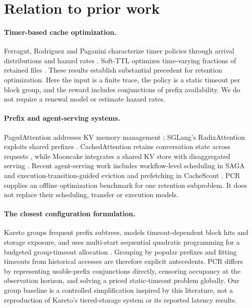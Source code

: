 \documentclass[11pt,a4paper]{article}
\begin{document}
\section{Relation to prior work}
\paragraph{Timer-based cache optimization.}
Ferragut, Rodriguez and Paganini characterize timer policies through arrival
distributions and hazard rates \cite{ferragut}. Soft-TTL optimizes time-varying
fractions of retained files \cite{softttl}. These results establish substantial
precedent for retention optimization. Here the input is a finite trace, the policy
is a static timeout per block group, and the reward includes conjunctions of
prefix availability. We do not require a renewal model or estimate hazard rates.

\paragraph{Prefix and agent-serving systems.}
PagedAttention addresses KV memory management \cite{paged}; SGLang's
RadixAttention exploits shared prefixes \cite{sglang}. CachedAttention retains
conversation state across requests \cite{cachedattention}, while Mooncake
integrates a shared KV store with disaggregated serving \cite{mooncake}. Recent
agent-serving work includes workflow-level scheduling in SAGA \cite{saga} and
execution-transition-guided eviction and prefetching in CacheScout
\cite{cachescout}. PCR supplies an offline optimization benchmark for one
retention subproblem. It does not replace their scheduling, transfer or execution
models.

\paragraph{The closest configuration formulation.}
Kareto groups frequent prefix subtrees, models timeout-dependent block hits and
storage exposure, and uses multi-start sequential quadratic programming for a
budgeted group-timeout allocation \cite{kareto}. Grouping by popular prefixes and
fitting timeouts from historical accesses are therefore explicit antecedents.
PCR differs by representing usable-prefix conjunctions directly, censoring
occupancy at the observation horizon, and solving a priced static-timeout problem
globally. Our group baseline is a controlled simplification inspired by this
literature, not a reproduction of Kareto's tiered-storage system or its reported
latency results.
\end{document}
